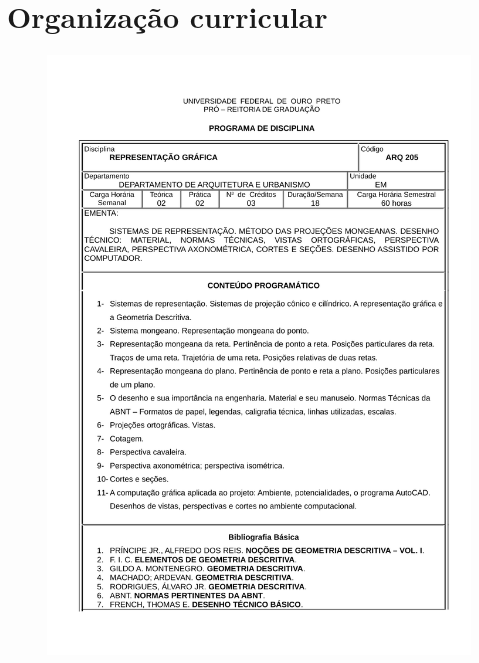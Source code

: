 \chapter{Organização curricular} 
\label{ape:01} 
%
\begin{figure}[hp]
	\centering 
		\includegraphics[scale=0.6]{capitulos/anexo1-programas-disciplina/p11.pdf}
\end{figure}

